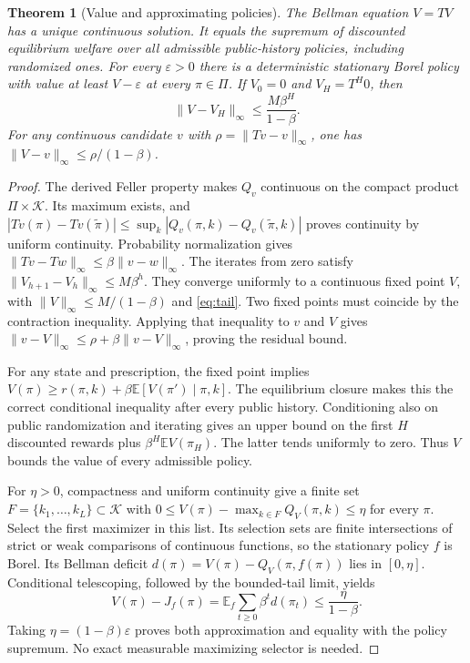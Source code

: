 \documentclass[11pt,a4paper]{article}
\newtheorem{theorem}{Theorem}
\newcommand{\E}{\mathbb E}
\newcommand{\cK}{\mathcal K}
\begin{document}
\begin{theorem}[Value and approximating policies]\label{thm:bellman}
The Bellman equation $V=TV$ has a unique continuous solution. It equals the
supremum of discounted equilibrium welfare over all admissible public-history
policies, including randomized ones. For every $\varepsilon>0$ there is a
deterministic stationary Borel policy with value at least $V-\varepsilon$
at every $\pi\in\Pi$. If $V_0=0$ and $V_H=T^H0$, then
\begin{equation}\label{eq:tail}
 \|V-V_H\|_\infty\leq\frac{M\beta^H}{1-\beta}.
\end{equation}
For any continuous candidate $v$ with
$\rho=\|Tv-v\|_\infty$, one has
$\|V-v\|_\infty\leq\rho/(1-\beta)$.
\end{theorem}
\begin{proof}
The derived Feller property makes $Q_v$ continuous on the compact product
$\Pi\times\cK$. Its maximum exists, and
$|Tv(\pi)-Tv(\widetilde\pi)|\leq
\sup_k|Q_v(\pi,k)-Q_v(\widetilde\pi,k)|$ proves continuity by uniform
continuity. Probability normalization gives
$\|Tv-Tw\|_\infty\leq\beta\|v-w\|_\infty$.
The iterates from zero satisfy
$\|V_{h+1}-V_h\|_\infty\leq M\beta^h$. They converge uniformly to a
continuous fixed point $V$, with $\|V\|_\infty\leq M/(1-\beta)$ and
\eqref{eq:tail}. Two fixed points must coincide by the contraction inequality.
Applying that inequality to $v$ and $V$ gives
$\|v-V\|_\infty\leq\rho+\beta\|v-V\|_\infty$, proving the residual bound.

For any state and prescription, the fixed point implies
$V(\pi)\geq r(\pi,k)+\beta\E[V(\pi')\mid\pi,k]$.
The equilibrium closure makes this the correct conditional inequality after
every public history. Conditioning also on public randomization and iterating
gives an upper bound on the first $H$ discounted rewards plus
$\beta^H\E V(\pi_H)$. The latter tends uniformly to zero. Thus $V$ bounds
the value of every admissible policy.

For $\eta>0$, compactness and uniform continuity give a finite set
$F=\{k_1,\ldots,k_L\}\subset\cK$ with
$0\leq V(\pi)-\max_{k\in F}Q_V(\pi,k)\leq\eta$ for every $\pi$.
Select the first maximizer in this list. Its selection sets are finite
intersections of strict or weak comparisons of continuous functions, so the
stationary policy $f$ is Borel. Its Bellman deficit
$d(\pi)=V(\pi)-Q_V(\pi,f(\pi))$ lies in $[0,\eta]$.
Conditional telescoping, followed by the bounded-tail limit, yields
\[
 V(\pi)-J_f(\pi)=\E_f\sum_{t\geq0}\beta^td(\pi_t)
 \leq\frac{\eta}{1-\beta}.
\]
Taking $\eta=(1-\beta)\varepsilon$ proves both approximation and equality
with the policy supremum. No exact measurable maximizing selector is needed.
\end{proof}
\end{document}
